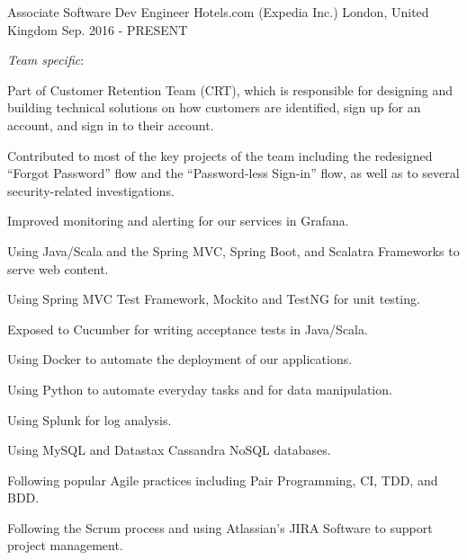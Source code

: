 

\begin{cventries}

  \cventry
    {Associate Software Dev Engineer} %
    {Hotels.com (Expedia Inc.)} %
    {London, United Kingdom} %
    {Sep. 2016 - PRESENT} %
    {
    \textit{Team specific}:
    \vspace{12pt}
      \begin{cvitems} %
        \item {Part of Customer Retention Team (CRT), which is responsible for designing and building technical solutions on how customers are identified, sign up for an account, and sign in to their account.}
        \item {Contributed to most of the key projects of the team including the redesigned ``Forgot Password'' flow and the ``Password-less Sign-in'' flow, as well as to several security-related investigations.}
        \item{Improved monitoring and alerting for our services in Grafana.}
                \item {Using Java/Scala and the Spring MVC, Spring Boot, and Scalatra Frameworks to serve web content.}
        \item {Using Spring MVC Test Framework, Mockito and TestNG for unit testing.}
        \item{Exposed to Cucumber for writing acceptance tests in Java/Scala.}
        \item {Using Docker to automate the deployment of our applications.}
        \item {Using Python to automate everyday tasks and for data manipulation.}
        \item {Using Splunk for log analysis.}
       \item {Using MySQL and Datastax Cassandra NoSQL databases.}
        \item {Following popular Agile practices including Pair Programming, CI, TDD, and BDD.}
        \item {Following the Scrum process and using Atlassian's JIRA Software to support project management.}

\end{cvitems}}
\end{cventries}
